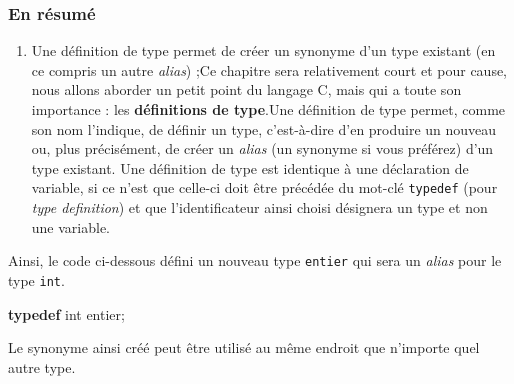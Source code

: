 \documentclass[]{article}
\date{}
\newenvironment{Shaded}{}{}
\newcommand{\KeywordTok}[1]{\textcolor[rgb]{0.00,0.44,0.13}{\textbf{{#1}}}}
\newcommand{\DataTypeTok}[1]{\textcolor[rgb]{0.56,0.13,0.00}{{#1}}}
\newcommand{\DecValTok}[1]{\textcolor[rgb]{0.25,0.63,0.44}{{#1}}}
\newcommand{\SpecialCharTok}[1]{\textcolor[rgb]{0.25,0.44,0.63}{{#1}}}
\newcommand{\StringTok}[1]{\textcolor[rgb]{0.25,0.44,0.63}{{#1}}}
\newcommand{\ImportTok}[1]{{#1}}
\newcommand{\ControlFlowTok}[1]{\textcolor[rgb]{0.00,0.44,0.13}{\textbf{{#1}}}}
\newcommand{\PreprocessorTok}[1]{\textcolor[rgb]{0.74,0.48,0.00}{{#1}}}
\newcommand{\NormalTok}[1]{{#1}}
\providecommand{\tightlist}{%
  \setlength{\itemsep}{0pt}\setlength{\parskip}{0pt}}
\begin{document}
{
\setcounter{tocdepth}{3}
\tableofcontents
}
\subsubsection{En résumé}\label{en-ruxe9sumuxe9}

\begin{enumerate}
\def\labelenumi{\arabic{enumi}.}
\tightlist
\item
  Une définition de type permet de créer un synonyme d'un type existant
  (en ce compris un autre \emph{alias}) ;Ce chapitre sera relativement
  court et pour cause, nous allons aborder un petit point du langage C,
  mais qui a toute son importance : les \textbf{définitions de type}.Une
  définition de type permet, comme son nom l'indique, de définir un
  type, c'est-à-dire d'en produire un nouveau ou, plus précisément, de
  créer un \emph{alias} (un synonyme si vous préférez) d'un type
  existant. Une définition de type est identique à une déclaration de
  variable, si ce n'est que celle-ci doit être précédée du mot-clé
  \texttt{typedef} (pour \emph{type definition}) et que l'identificateur
  ainsi choisi désignera un type et non une variable.
\end{enumerate}

Ainsi, le code ci-dessous défini un nouveau type \texttt{entier} qui
sera un \emph{alias} pour le type \texttt{int}.

\begin{Shaded}
\begin{Highlighting}[]
\KeywordTok{typedef} \DataTypeTok{int} \NormalTok{entier;}
\end{Highlighting}
\end{Shaded}

Le synonyme ainsi créé peut être utilisé au même endroit que n'importe
quel autre type.

\begin{Shaded}
\end{Shaded}
\end{document}
